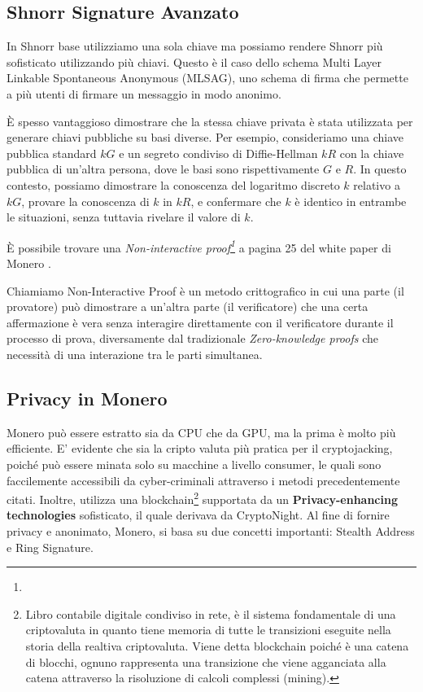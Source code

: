 \documentclass[12pt,a4paper]{article}
\begin{document}
\subsection{Shnorr Signature Avanzato}
In Shnorr base utilizziamo una sola chiave ma possiamo rendere Shnorr più
sofisticato utilizzando più chiavi. Questo è il caso dello schema Multi Layer
Linkable Spontaneous Anonymous (MLSAG), uno schema di firma che permette a più
utenti di firmare un messaggio in modo anonimo. 

È spesso vantaggioso dimostrare che la stessa chiave privata è stata utilizzata
per generare chiavi pubbliche su basi diverse. Per esempio, consideriamo una
chiave pubblica standard $kG$ e un segreto condiviso di Diffie-Hellman $kR$ con
la chiave pubblica di un'altra persona, dove le basi sono rispettivamente $G$ e
$R$. In questo contesto, possiamo dimostrare la conoscenza del logaritmo
discreto $k$ relativo a $kG$, provare la conoscenza di $k$ in $kR$, e confermare
che $k$ è identico in entrambe le situazioni, senza tuttavia rivelare il valore
di $k$.

È possibile trovare una \textit{Non-interactive proof\footnote{}} a pagina 25
del white paper di Monero \cite{Zero To Monero}.

Chiamiamo Non-Interactive Proof è un metodo crittografico in cui una parte (il
provatore) può dimostrare a un'altra parte (il verificatore) che una certa
affermazione è vera senza interagire direttamente con il verificatore durante il
processo di prova, diversamente dal tradizionale \textit{Zero-knowledge proofs}
che necessità di una interazione tra le parti simultanea.

\subsection{Privacy in Monero}

Monero può essere estratto sia da CPU che da GPU, ma la prima è molto più
efficiente. E' evidente che sia la cripto valuta più pratica per il
cryptojacking, poiché può essere minata solo su macchine a livello consumer, le
quali sono faccilemente accessibili da cyber-criminali attraverso i metodi
precedentemente citati. Inoltre, utilizza una blockchain\footnote{Libro
contabile digitale condiviso in rete, è il sistema fondamentale di una
criptovaluta in quanto tiene memoria di tutte le transizioni eseguite nella
storia della realtiva criptovaluta. Viene detta blockchain poiché è una catena
di blocchi, ognuno rappresenta una transizione che viene agganciata alla catena
attraverso la risoluzione di calcoli complessi (mining).} supportata da un
\textbf{Privacy-enhancing technologies} sofisticato, il quale derivava da
CryptoNight. Al fine di fornire privacy e anonimato, Monero, si basa su due
concetti importanti: Stealth Address e Ring Signature.
\end{document}
